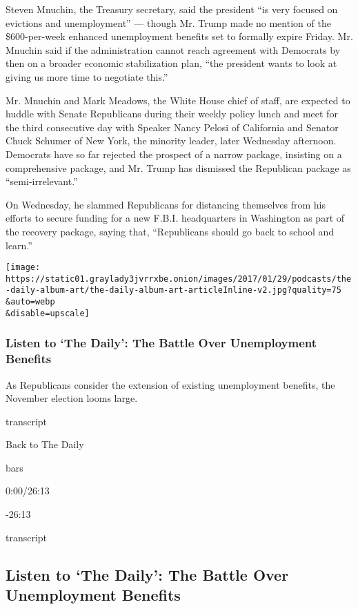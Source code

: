 Steven Mnuchin, the Treasury secretary, said the president ``is very
focused on evictions and unemployment'' --- though Mr. Trump made no
mention of the \$600-per-week enhanced unemployment benefits set to
formally expire Friday. Mr. Mnuchin said if the administration cannot
reach agreement with Democrats by then on a broader economic
stabilization plan, ``the president wants to look at giving us more time
to negotiate this.''

Mr. Mnuchin and Mark Meadows, the White House chief of staff, are
expected to huddle with Senate Republicans during their weekly policy
lunch and meet for the third consecutive day with Speaker Nancy Pelosi
of California and Senator Chuck Schumer of New York, the minority
leader, later Wednesday afternoon. Democrats have so far rejected the
prospect of a narrow package, insisting on a comprehensive package, and
Mr. Trump has dismissed the Republican package as ``semi-irrelevant.''

On Wednesday, he slammed Republicans for distancing themselves from his
efforts to secure funding for a new F.B.I. headquarters in Washington as
part of the recovery package, saying that, ``Republicans should go back
to school and learn.''

\texttt{[image: https://static01.graylady3jvrrxbe.onion/images/2017/01/29/podcasts/the-daily-album-art/the-daily-album-art-articleInline-v2.jpg?quality=75\\\&auto=webp\\\&disable=upscale]}

\hypertarget{listen-to-the-daily-the-battle-over-unemployment-benefits}{%
\subsubsection{Listen to `The Daily': The Battle Over Unemployment
Benefits}\label{listen-to-the-daily-the-battle-over-unemployment-benefits}}

As Republicans consider the extension of existing unemployment benefits,
the November election looms large.

transcript

Back to The Daily

bars

0:00/26:13

-26:13

transcript

\hypertarget{listen-to-the-daily-the-battle-over-unemployment-benefits-1}{%
\subsection{Listen to `The Daily': The Battle Over Unemployment
Benefits}\label{listen-to-the-daily-the-battle-over-unemployment-benefits-1}}

